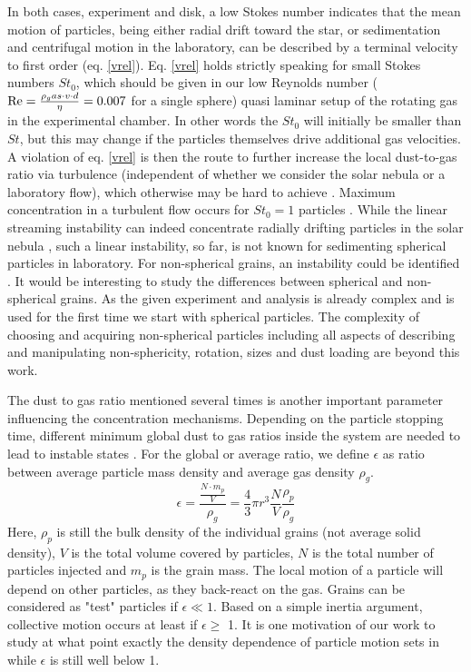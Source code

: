 {{In both cases, experiment and disk, a low Stokes number indicates that the mean motion of particles, being either radial drift toward the star, or sedimentation and centrifugal motion in the laboratory, can be described by a terminal velocity to first order (eq. \ref{vrel}).}
Eq. \ref{vrel} holds strictly speaking for small Stokes numbers $St_0$, which should be given in our low Reynolds number (${\rm Re} = \frac{\rho_gas \cdot v \cdot d}{\eta} = 0.007$ for a single sphere) quasi laminar setup of
the rotating gas in the experimental chamber.
In other words the $St_0$ will initially be smaller than $St$, but this may change if the particles themselves drive additional gas velocities. A violation of eq. \ref{vrel} is then the route to further increase the local dust-to-gas ratio via turbulence (independent of whether we consider the solar nebula or a laboratory flow), which otherwise may be hard to achieve \citep{Johansen2005}. Maximum concentration in a turbulent flow occurs for $St_0=1$ particles \citep{Ormel2007}.
While the linear streaming instability can indeed concentrate radially drifting particles in the solar nebula  \citep{Youdin2005}, such a linear instability, so far, is not known for sedimenting spherical particles in laboratory. For non-spherical grains, an instability could be identified \citep{koch_shaqfeh_1989}}. 
{It would be interesting to study the differences between spherical and non-spherical grains. As the given experiment and analysis is already complex and is used for the first time we start with spherical particles. The complexity of choosing and acquiring non-spherical particles including all aspects of describing and manipulating non-sphericity, rotation, sizes and dust loading are beyond this work.}

The dust to gas ratio mentioned several times is another important parameter {influencing the concentration mechanisms. Depending on the particle stopping time, different minimum global dust to gas ratios inside the system are needed to lead to instable states \citep{yang2017}.} For the global or average ratio, we define $\epsilon$ as ratio between average particle mass density and average gas density $\rho_g$.
\begin{equation}
\epsilon = \frac{\frac{N \cdot m_p}{V}}{\rho_g} = \frac{4}{3} \pi r^3 \frac{N}{V} \frac{\rho_p}{\rho_g}
\label{epsilon}
\end{equation}
Here, $\rho_p$ is still the bulk density of the individual grains (not average solid density), $V$ is the total volume covered by particles, $N$ is the total number of particles injected and $m_p$ is the grain mass.
The local motion of a particle will depend on other particles, as they back-react on the gas. 
Grains can be considered as "test" particles if $\epsilon \ll 1$. 
Based on a simple inertia argument, collective motion occurs at least if $\epsilon \geq$ 1.
It is one motivation of our work to study at what point exactly the density dependence of particle motion sets in while $\epsilon$ is still well below 1.

